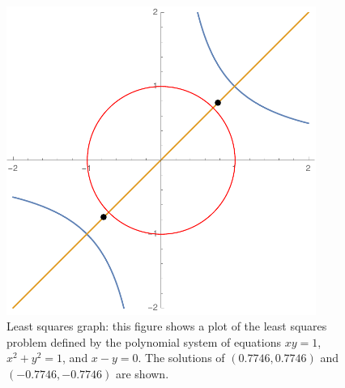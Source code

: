 
\begin{figure}
\centering
\includegraphics[width=0.9\textwidth]{fig3.pdf}
\caption{Least squares graph: this figure shows a plot of the least squares problem defined by the polynomial system of equations $xy=1$, $x^2 + y^2 =1$, and $x-y=0$.
The solutions of $(0.7746,0.7746)$ and $(-0.7746,-0.7746)$ are shown.
}
\label{fig:ls-graph}
\end{figure}